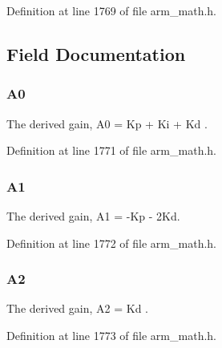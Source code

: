 Definition at line 1769 of file arm\+\_\+math.\+h.



\subsection{Field Documentation}
\subsubsection[{\texorpdfstring{A0}{A0}}]{ A0}\hypertarget{structarm__pid__instance__f32_afc2ed2bf70b7d9d84f49ee9ae7caa004}{}\label{structarm__pid__instance__f32_afc2ed2bf70b7d9d84f49ee9ae7caa004}
The derived gain, A0 = Kp + Ki + Kd . 

Definition at line 1771 of file arm\+\_\+math.\+h.

\subsubsection[{\texorpdfstring{A1}{A1}}]{ A1}\hypertarget{structarm__pid__instance__f32_a5e6785a3a5cf7b98f3bfc7b180d98273}{}\label{structarm__pid__instance__f32_a5e6785a3a5cf7b98f3bfc7b180d98273}
The derived gain, A1 = -\/\+Kp -\/ 2\+Kd. 

Definition at line 1772 of file arm\+\_\+math.\+h.

\subsubsection[{\texorpdfstring{A2}{A2}}]{ A2}\hypertarget{structarm__pid__instance__f32_a5b00947275caf079f351271bf41573fe}{}\label{structarm__pid__instance__f32_a5b00947275caf079f351271bf41573fe}
The derived gain, A2 = Kd . 

Definition at line 1773 of file arm\+\_\+math.\+h.

